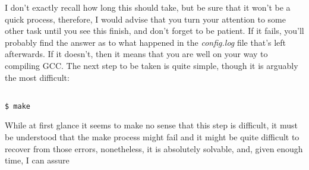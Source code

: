 \documentclass[]{article}
\begin{document}
                                                                                                                                                                                                                       I don't exactly recall how long this should take, but be sure that it won't be a quick process, therefore, I would advise that you turn
                                                                                                                                                                                                                       your attention to some other task until you see this finish, and don't forget to be patient. If it fails, you'll probably
                                                                                                                                                                                                                       find the answer as to what happened in the \textit{config.log} file that's left afterwards. If it doesn't, then it means that you are 
                                                                                                                                                                                                                       well on your way to compiling GCC. The next step to be taken is quite simple, though it is arguably the most difficult:
                                                                                                                                                                                                                       \begin{lstlisting}
                                                                                                                                                                                                                       $ make
                                                                                                                                                                                                                       \end{lstlisting}
                                                                                                                                                                                                                       While at first glance it seems to make no sense that this step is difficult, it must be understood that the make process might fail and
                                                                                                                                                                                                                       it might be quite difficult to recover from those errors, nonetheless, it is absolutely solvable, and, given enough time, I can assure 
\end{document}
